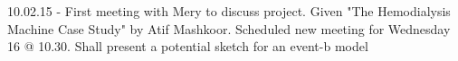 10.02.15 - First meeting with Mery to discuss project. Given "The Hemodialysis Machine Case Study" by Atif Mashkoor. Scheduled new meeting for Wednesday 16 @ 10.30. Shall present a potential sketch for an event-b model
